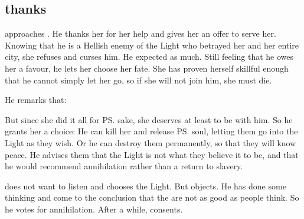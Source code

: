 






\subsection[Psyrex thanks Tiroco]{\Psyrex{} thanks \Tiroco}
\Psyrex{} approaches \Tiroco{}. He thanks her for her help and gives her an offer to serve her. Knowing that he is a Hellish enemy of the Light who betrayed her and her entire city, she refuses and curses him. He expected as much. Still feeling that he owes her a favour, he lets her choose her fate. She has proven herself skillful enough that he cannot simply let her go, so if she will not join him, she must die. %

He remarks that: 

But since she did it all for \ps{\Icor} sake, she deserves at least to be with him. So he grants her a choice: He can kill her and release \ps{\Icor} soul, letting them go into the Light as they wish. Or he can destroy them permanently, so that they will know peace. He advises them that the Light is not what they believe it to be, and that he would recommend annihilation rather than a return to slavery. 

\Tiroco{} does not want to listen and chooses the Light. But \Icor{} objects. He has done some thinking and come to the conclusion that the \Sephiroth{} are not as good as people think. So he votes for annihilation. After a while, \Tiroco{} consents. 

